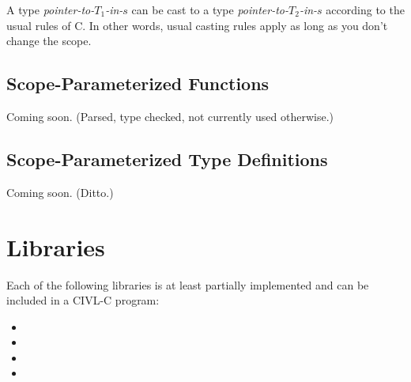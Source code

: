 A type \emph{pointer-to-$T_1$-in-$s$} can be cast to a type
\emph{pointer-to-$T_2$-in-$s$} according to the usual rules of C.  In
other words, usual casting rules apply as long as you don't change the
scope.

\section{Scope-Parameterized Functions}

Coming soon.  (Parsed, type checked, not currently used otherwise.)

\section{Scope-Parameterized Type Definitions}

Coming soon. (Ditto.)

\chapter{Libraries}

Each of the following libraries is at least partially implemented and can
be included in a CIVL-C program:
\begin{itemize}
\item {}
\item {}
\item {}
\item {}
\end{itemize}
